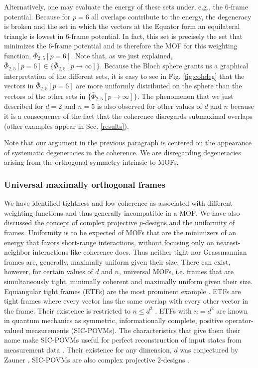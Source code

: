 \documentclass[%
superscriptaddress,
amsmath,amssymb,
 aps,
pra,
floatfix,
]{revtex4-2}
\begin{document}
Alternatively, one may evaluate the energy of these sets under, e.g., the $6$-frame potential. Because for $p=6$ all overlaps contribute to the energy, the degeneracy is broken and the set in which the vectors at the Equator form an equilateral triangle is lowest in $6$-frame potential. In fact, this set is precisely the set that minimizes the $6$-frame potential and is therefore the MOF for this weighting function, $\bar \Phi_{2, 5}[p = 6]$. Note that, as we just explained, $\bar \Phi_{2, 5}[p = 6] \in \{\bar \Phi_{2, 5}[p \to \infty] \}$. Because the Bloch sphere grants us a graphical interpretation of the different sets, it is easy to see in Fig. \ref{fig:cohdeg} that the vectors in $\bar \Phi_{2, 5}[p = 6]$ are more uniformly distributed on the sphere than the vectors of the other sets in $\{\bar \Phi_{2, 5}[p \to \infty] \}$. The phenomenon that we just described for $d=2$ and $n=5$ is also observed for other values of $d$ and $n$ because it is a consequence of the fact that the coherence disregards submaximal overlaps (other examples appear in Sec. \ref{results}).

Note that our argument in the previous paragraph is centered on the appearance of systematic degeneracies in the coherence. We are disregarding degeneracies arising from the orthogonal symmetry intrinsic to MOFs.  

\subsubsection{Universal maximally orthogonal frames}\label{subsubsec:univarsal_mof}

We have identified tightness and low coherence as associated with different weighting functions and thus generally incompatible in a MOF. We have also discussed the concept of complex projective $p$-designs and the uniformity of frames. Uniformity is to be expected of MOFs that are the minimizers of an energy that favors short-range interactions, without focusing only on nearest-neighbor interactions like coherence does. Thus neither tight nor Grassmannian frames are, generally, maximally uniform given their size. There can exist, however, for certain values of $d$ and $n$, universal MOFs, i.e. frames that are simultaneously tight, minimally coherent and maximally uniform given their size. Equiangular tight frames (ETFs) are the most prominent example \cite{strohmer2003grassmannian}. ETFs are tight frames where every vector has the same overlap with every other vector in the frame.
Their existence is restricted to $n \leq d^2$ \cite{sustik2007on}. ETFs with $n=d^2$ are known in quantum mechanics as symmetric, informationally complete, positive operator-valued measurements (SIC-POVMs). The characteristics that give them their name make SIC-POVMs useful for perfect reconstruction of input states from measurement data \cite{renes2004symmetric, scott2006tight, slomczynski2015highly, yoshida2022construction, gu2020fast, jameson2024optimal}. Their existence for any dimension, $d$ was conjectured by Zauner \cite{zauner2011quantum}. SIC-POVMs are also complex projective 2-designs \cite{renes2004symmetric}. 
\end{document}
